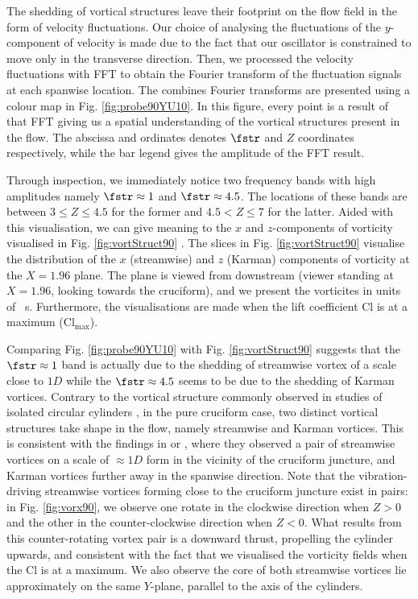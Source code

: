 \documentclass[a4paper,fleqn]{cas-sc}
\begin{document}
The shedding of vortical structures leave their footprint on the flow field in the form of velocity fluctuations. Our choice of analysing the fluctuations of the $y$-component of velocity is made due to the fact that our oscillator is constrained to move only in the transverse direction. Then, we processed the velocity fluctuations with FFT to obtain the Fourier transform of the fluctuation signals at each spanwise location. The combines Fourier transforms are presented using a colour map in Fig. \ref{fig:probe90YU10}. In this figure, every point is a result of that FFT giving us a spatial understanding of the vortical structures present in the flow. The abscissa and ordinates denotes $\fstr$ and $Z$ coordinates respectively, while the bar legend gives the amplitude of the FFT result.

Through inspection, we immediately notice two frequency bands with high amplitudes namely $\fstr \approx 1$ and $\fstr \approx 4.5$. The locations of these bands are between $3 \leq Z \leq 4.5$ for the former and $4.5 < Z \leq 7$ for the latter. Aided with this visualisation, we can give meaning to the $x$ and $z$-components of vorticity visualised in Fig. \ref{fig:vortStruct90} . The slices in Fig. \ref{fig:vortStruct90} visualise the distribution of the $x$ (streamwise) and $z$ (Karman) components of vorticity at the $X = 1.96$ plane. The plane is viewed from downstream (viewer standing at $X = 1.96$, looking towards the cruciform), and we present the vorticites in units of \si{\per\second}. Furthermore, the visualisations are made when the lift coefficient Cl is at a maximum ($\text{Cl}_{\text{max}}$).

Comparing Fig. \ref{fig:probe90YU10} with Fig. \ref{fig:vortStruct90} suggests that the $\fstr \approx 1$ band is actually due to the shedding of streamwise vortex of a scale close to $1D$ while the $\fstr \approx 4.5$ seems to be due to the shedding of Karman vortices. Contrary to the vortical structure commonly observed in studies of isolated circular cylinders \citep{Deng2007,Kinaci2016,Duranay2020}, in the pure cruciform case, two distinct vortical structures take shape in the flow, namely streamwise and Karman vortices. This is consistent with the findings in \citet{Koide2017} or \citet{Zhao2018a}, where they observed a pair of streamwise vortices on a scale of $\approx 1D$ form in the vicinity of the cruciform juncture, and Karman vortices further away in the spanwise direction. Note that the vibration-driving streamwise vortices forming close to the cruciform juncture exist in pairs: in Fig. \ref{fig:vorx90}, we observe one rotate in the clockwise direction when $Z > 0$ and the other in the counter-clockwise direction when $Z < 0$. What results from this counter-rotating vortex pair is a downward thrust, propelling the cylinder upwards, and consistent with the fact that we visualised the vorticity fields when the Cl is at a maximum. We also observe the core of both streamwise vortices lie approximately on the same $Y$-plane, parallel to the axis of the cylinders.
\end{document}
